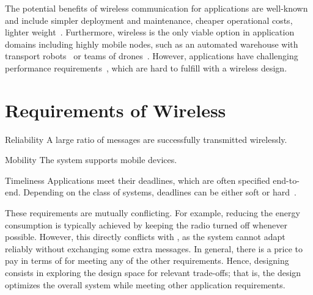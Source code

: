 The potential benefits of wireless communication for \CPS applications are well-known and include \eg simpler deployment and maintenance, cheaper operational costs, lighter weight~\cite{luvisotto2017Ultra}.
Furthermore, wireless is the only viable option in application domains including highly mobile nodes, such as an automated warehouse with transport robots~\cite{haegele2018Logistics} or teams of drones~\cite{mottola2014Teamlevela}.
However, \CPS applications have challenging performance requirements~\cite{akerberg2011Future}, which are hard to fulfill with a wireless design.


\section{Requirements of Wireless \CPS}

\squarepar{%
	\CPS applications are subject to different types of requirements, such as the specified end-to-end latency, bandwidth, or number of devices; the precise performance level for these requirements depends on the application context.
	Generally, \CPS requirements belong to one of the following classes:%
}

\begin{features}[labelwidth=65pt, leftmargin=(\labelwidth+\labelsep)]

  \item[Reliability]
  A large ratio of messages are successfully transmitted wirelessly.

	\squarepar{%
	  \item[Adaptability]
	  The system adapts to runtime changes in resource demands.%
	}

	\item[Mobility]
  The system supports mobile devices.

	\item[Timeliness]
  Applications meet their deadlines, which are often specified end-to-end. Depending on the class of systems, deadlines can be either soft or hard~\cite{buttazzo2011HardRT}.

	\squarepar{%
	  \item[Efficiency]
	  The system supports short end-to-end latency, scales in terms of system size, and optimizes its energy and bandwidth utilization.%
	}

\end{features}

These requirements are mutually conflicting. For example, reducing the energy consumption is typically achieved by keeping the radio turned off whenever possible.
However, this directly conflicts with , as the system cannot adapt reliably without exchanging some extra messages.
In general, there is a price to pay in terms of  for meeting any of the other requirements.
Hence, designing \CPS consists in exploring the design space for relevant trade-offs; that is, the design optimizes the overall system  while meeting other application requirements.



